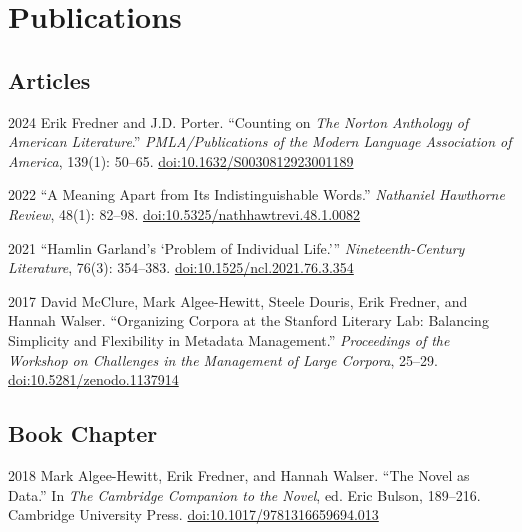 \documentclass[12pt,letterpaper]{report}
\begin{document}
\section*{Publications}

\subsection*{Articles}

\begin{tablist}
	\item[2024] \tab{}Erik Fredner and J.D. Porter. \enquote{Counting on \textit{The Norton Anthology of American Literature}.} \textit{PMLA/Publications of the Modern Language Association of America}, 139(1): 50--65. \href{https://doi.org/10.1632/S0030812923001189}{doi:10.1632/S0030812923001189}
	\item[2022] \tab{}\enquote{A Meaning Apart from Its Indistinguishable Words.} \textit{Nathaniel Hawthorne Review}, 48(1): 82--98. \href{https://doi.org/10.5325/nathhawtrevi.48.1.0082}{doi:10.5325/nathhawtrevi.48.1.0082}
	\item[2021] \tab{}\enquote{Hamlin Garland's \enquote{Problem of Individual Life.}} \textit{Nineteenth-Century Literature}, 76(3): 354--383. \href{https://doi.org/10.1525/ncl.2021.76.3.354}{doi:10.1525/ncl.2021.76.3.354}
	\item[2017] \tab{}David McClure, Mark Algee-Hewitt, Steele Douris, Erik Fredner, and Hannah Walser. \enquote{Organizing Corpora at the Stanford Literary Lab: Balancing Simplicity and Flexibility in Metadata Management.} \textit{Proceedings of the Workshop on Challenges in the Management of Large Corpora}, 25--29. \href{https://ids-pub.bsz-bw.de/frontdoor/index/index/docId/6261}{doi:10.5281/zenodo.1137914}
\end{tablist}

\subsection*{Book Chapter}

\begin{tablist}
	\item[2018] \tab{}Mark Algee-Hewitt, Erik Fredner, and Hannah Walser. \enquote{The Novel as Data.} In \textit{The Cambridge Companion to the Novel}, ed. Eric Bulson, 189--216. Cambridge University Press. \href{https://doi.org/10.1017/9781316659694.013}{doi:10.1017/9781316659694.013}
\end{tablist}
\end{document}
